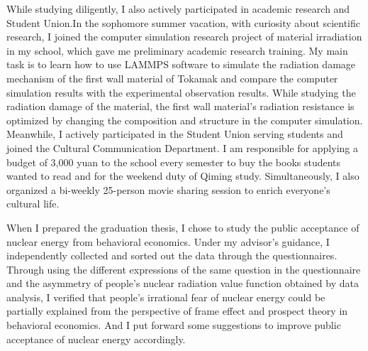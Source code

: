 While studying diligently, I also actively participated in academic research and Student
Union.In the sophomore summer vacation, with curiosity about scientific research, I joined the
computer simulation research project of material irradiation in my school, which gave me
preliminary academic research training. My main task is to learn how to use LAMMPS software
to simulate the radiation damage mechanism of the first wall material of Tokamak and compare
the computer simulation results with the experimental observation results. While studying the radiation damage of the material, the first wall material's radiation resistance is optimized by
changing the composition and structure in the computer simulation. Meanwhile, I actively
participated in the Student Union serving students and joined the Cultural Communication
Department. I am responsible for applying a budget of 3,000 yuan to the school every semester
to buy the books students wanted to read and for the weekend duty of Qiming study.
Simultaneously, I also organized a bi-weekly 25-person movie sharing session to enrich
everyone's cultural life.

When I prepared the graduation thesis, I chose to study the public acceptance of nuclear energy
from behavioral economics. Under my advisor's guidance, I independently collected and sorted
out the data through the questionnaires. Through using the different expressions of the same
question in the questionnaire and the asymmetry of people's nuclear radiation value function
obtained by data analysis, I verified that people's irrational fear of nuclear energy could be
partially explained from the perspective of frame effect and prospect theory in behavioral
economics. And I put forward some suggestions to improve public acceptance of nuclear energy
accordingly.